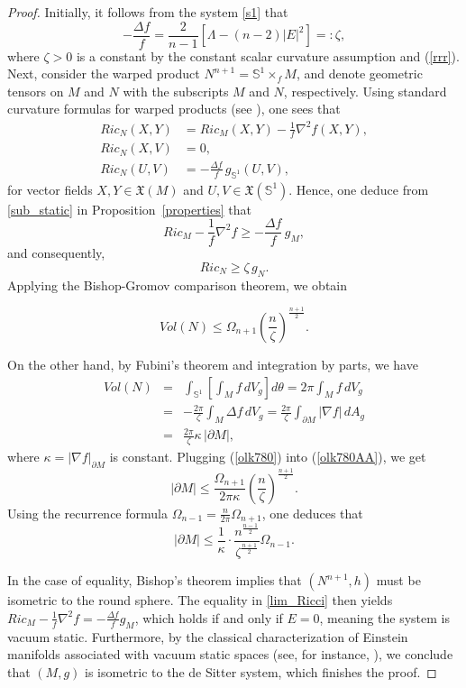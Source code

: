 \documentclass{amsart}
\numberwithin{equation}{section}
\begin{document}
\begin{proof}
Initially, it follows from the system \eqref{s1} that
\[
- \frac{\Delta f}{f} = \frac{2}{n-1} \left[ \Lambda - (n-2)|E|^2 \right] =: \zeta,
\]
where \( \zeta > 0 \) is a constant by the constant scalar curvature assumption and (\ref{rrr}). Next, consider the warped product \( N^{n+1} = \mathbb{S}^1 \times_f M \), and denote geometric tensors on \( M \) and \( N \) with the subscripts \( M \) and \( N \), respectively. Using standard curvature formulas for warped products (see \cite[Chapter~7]{oneill}), one sees that
\begin{align*}
Ric_N(X,Y) &= Ric_M(X,Y) - \frac{1}{f} \nabla^2 f(X,Y), \\
Ric_N(X,V) &= 0, \\
Ric_N(U,V) &= -\frac{\Delta f}{f} \, g_{\mathbb{S}^1}(U, V),
\end{align*}
for vector fields \( X, Y \in \mathfrak{X}(M) \) and \( U, V \in \mathfrak{X}(\mathbb{S}^1) \).
Hence, one deduce from \eqref{sub_static} in Proposition~\ref{properties} that
\begin{equation}\label{lim_Ricci}
Ric_M - \frac{1}{f} \nabla^2 f \geq -\frac{\Delta f}{f} \, g_M,
\end{equation}
and consequently,
\[
Ric_N \geq \zeta\, g_N.
\]
Applying the Bishop-Gromov comparison theorem, we obtain

\begin{equation}
\label{olk780AA}
Vol(N) \leq \Omega_{n+1} \left( \frac{n}{\zeta} \right)^{\frac{n+1}{2}}.
\end{equation}



On the other hand, by Fubini's theorem and integration by parts, we have
\begin{eqnarray}
\label{olk780}
Vol(N) &=& \int_{\mathbb{S}^1} \left[ \int_M f \, dV_g \right] d\theta = 2\pi \int_M f \, dV_g \nonumber\\
&=& -\frac{2\pi}{\zeta} \int_M \Delta f \, dV_g = \frac{2\pi}{\zeta} \int_{\partial M} |\nabla f| \, dA_g \nonumber\\
&=& \frac{2\pi}{\zeta} \kappa \, |\partial M|,
\end{eqnarray}
where \( \kappa = |\nabla f|_{\partial M} \) is constant. Plugging (\ref{olk780}) into (\ref{olk780AA}), we get
\[
|\partial M| \leq \frac{\Omega_{n+1}}{2\pi \kappa} \left( \frac{n}{\zeta} \right)^{\frac{n+1}{2}}.
\]
Using the recurrence formula \( \Omega_{n-1} = \frac{n}{2\pi} \Omega_{n+1} \), one deduces that
\[
|\partial M| \leq \frac{1}{\kappa} \cdot \frac{n^{\frac{n-1}{2}}}{\zeta^{\frac{n+1}{2}}} \Omega_{n-1}.
\]


In the case of equality, Bishop’s theorem implies that 
\( (N^{n+1}, h) \) must be isometric to the round sphere. The equality in \eqref{lim_Ricci} then yields \( Ric_M - \frac{1}{f} \nabla^2 f = -\frac{\Delta f}{f} g_M \), which holds if and only if \( E = 0 \), meaning the system is vacuum static. Furthermore, by the classical characterization of Einstein manifolds associated with vacuum static spaces (see, for instance, \cite[Section~5]{ambrozio}), we conclude that \( (M, g) \) is isometric to the de Sitter system, which finishes the proof. 
\end{proof}
\end{document}
